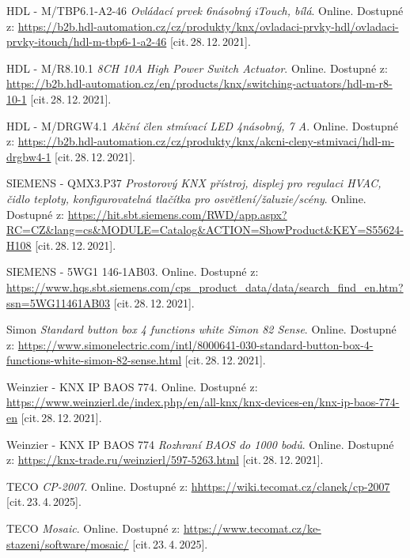 \begin{thebibliography}{99}
        HDL - M/TBP6.1-A2-46 \textit{Ovládací prvek 6násobný iTouch, bílá}.\/ Online. 
		Dostupné z:
    \url{https://b2b.hdl-automation.cz/cz/produkty/knx/ovladaci-prvky-hdl/ovladaci-prvky-itouch/hdl-m-tbp6-1-a2-46}
		[cit.\,28.\,12.\,2021].
    
        HDL - M/R8.10.1 \textit{8CH 10A High Power Switch Actuator}.\/ Online. 
		Dostupné z:
    \url{https://b2b.hdl-automation.cz/en/products/knx/switching-actuators/hdl-m-r8-10-1}
		[cit.\,28.\,12.\,2021].
    
        HDL - M/DRGW4.1 \textit{Akční člen stmívací LED 4násobný, 7 A}.\/ Online. 
		Dostupné z:
    \url{https://b2b.hdl-automation.cz/cz/produkty/knx/akcni-cleny-stmivaci/hdl-m-drgbw4-1}
		[cit.\,28.\,12.\,2021].
    
		SIEMENS - QMX3.P37 \textit{Prostorový KNX přístroj, displej pro regulaci HVAC, čidlo teploty, konfigurovatelná tlačítka pro osvětlení/žaluzie/scény}.\/ Online. 
		Dostupné z:
    \url{https://hit.sbt.siemens.com/RWD/app.aspx?RC=CZ&lang=cs&MODULE=Catalog&ACTION=ShowProduct&KEY=S55624-H108}
		[cit.\,28.\,12.\,2021].
    
		SIEMENS - 5WG1 146-1AB03.\/ Online. 
		Dostupné z:
    \url{https://www.hqs.sbt.siemens.com/cps_product_data/data/search_find_en.htm?ssn=5WG11461AB03}
		[cit.\,28.\,12.\,2021].  
    
		Simon \emph{Standard button box 4 functions white Simon 82 Sense}.\/ Online. 
		Dostupné z:
    \url{https://www.simonelectric.com/intl/8000641-030-standard-button-box-4-functions-white-simon-82-sense.html}
		[cit.\,28.\,12.\,2021].

		Weinzier - KNX IP BAOS 774.\/ Online. 
		Dostupné z:
    \url{https://www.weinzierl.de/index.php/en/all-knx/knx-devices-en/knx-ip-baos-774-en}
		[cit.\,28.\,12.\,2021].
    
		Weinzier - KNX IP BAOS 774 \emph{Rozhraní BAOS do 1000 bodů}.\/ Online. 
		Dostupné z:
    \url{https://knx-trade.ru/weinzierl/597-5263.html}
		[cit.\,28.\,12.\,2021].

		TECO \emph{CP-2007}.\/ Online. 
		Dostupné z:
	\url{hhttps://wiki.tecomat.cz/clanek/cp-2007}
		[cit.\,23.\,4.\,2025].

		TECO \emph{Mosaic}.\/ Online. 
		Dostupné z:
	\url{https://www.tecomat.cz/ke-stazeni/software/mosaic/}
		[cit.\,23.\,4.\,2025].


\end{thebibliography}
